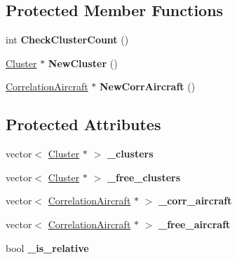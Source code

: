 \subsection*{Protected Member Functions}
\begin{DoxyCompactItemize}
\item 
\hypertarget{class_correlation_engine_a288301a0ee4961f8b017136ff5966f15}{}int {\bfseries Check\+Cluster\+Count} ()\label{class_correlation_engine_a288301a0ee4961f8b017136ff5966f15}

\item 
\hypertarget{class_correlation_engine_ae12e6e93195f9bf4dd33c6658a5b94e5}{}\hyperlink{class_cluster}{Cluster} $\ast$ {\bfseries New\+Cluster} ()\label{class_correlation_engine_ae12e6e93195f9bf4dd33c6658a5b94e5}

\item 
\hypertarget{class_correlation_engine_ac9e786cd54f824b8372ed5e8c392c81e}{}\hyperlink{class_correlation_aircraft}{Correlation\+Aircraft} $\ast$ {\bfseries New\+Corr\+Aircraft} ()\label{class_correlation_engine_ac9e786cd54f824b8372ed5e8c392c81e}

\end{DoxyCompactItemize}
\subsection*{Protected Attributes}
\begin{DoxyCompactItemize}
\item 
\hypertarget{class_correlation_engine_acbd33c95a13ee78d6a0aaaf1ee091213}{}vector$<$ \hyperlink{class_cluster}{Cluster} $\ast$ $>$ {\bfseries \+\_\+clusters}\label{class_correlation_engine_acbd33c95a13ee78d6a0aaaf1ee091213}

\item 
\hypertarget{class_correlation_engine_a8b802d3a173ace09821a38eafbb12303}{}vector$<$ \hyperlink{class_cluster}{Cluster} $\ast$ $>$ {\bfseries \+\_\+free\+\_\+clusters}\label{class_correlation_engine_a8b802d3a173ace09821a38eafbb12303}

\item 
\hypertarget{class_correlation_engine_a485c81491859f8b69748e6a55a935473}{}vector$<$ \hyperlink{class_correlation_aircraft}{Correlation\+Aircraft} $\ast$ $>$ {\bfseries \+\_\+corr\+\_\+aircraft}\label{class_correlation_engine_a485c81491859f8b69748e6a55a935473}

\item 
\hypertarget{class_correlation_engine_ae9e139beb4d41e956bcb3518c275588c}{}vector$<$ \hyperlink{class_correlation_aircraft}{Correlation\+Aircraft} $\ast$ $>$ {\bfseries \+\_\+free\+\_\+aircraft}\label{class_correlation_engine_ae9e139beb4d41e956bcb3518c275588c}

\item 
\hypertarget{class_correlation_engine_acaf9233b7295ac2e745feea37d8d8fa7}{}bool {\bfseries \+\_\+is\+\_\+relative}\label{class_correlation_engine_acaf9233b7295ac2e745feea37d8d8fa7}

\end{DoxyCompactItemize}


